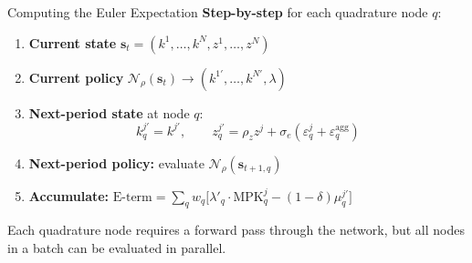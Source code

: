 \documentclass[aspectratio=169,11pt]{beamer}
\newcommand{\emphc}[1]{\textcolor{harvardcrimson}{#1}}
\begin{document}
\begin{frame}{Computing the Euler Expectation}
\textbf{Step-by-step} for each quadrature node $q$:

\vspace{0.3em}
\begin{enumerate}
    \item \textbf{Current state} $\bm{s}_t = (k^1, \ldots, k^N, z^1, \ldots, z^N)$
    \item \textbf{Current policy} $\mathcal{N}_\rho(\bm{s}_t) \to (k^{1\prime}, \ldots, k^{N\prime}, \lambda)$ 
    \item \textbf{Next-period state} at node $q$:
    \[
    k^{j\prime}_q = k^{j\prime}, \qquad z^{j\prime}_q = \rho_z z^j + \sigma_e(\varepsilon^j_q + \varepsilon^{\text{agg}}_q)
    \]
    \item \textbf{Next-period policy:} evaluate $\mathcal{N}_\rho(\bm{s}_{t+1,q})$
    \item \textbf{Accumulate:} $\text{E-term} = \sum_q w_q \bigl[\lambda'_q \cdot \text{MPK}^j_q - (1-\delta)\mu^{j\prime}_q\bigr]$
\end{enumerate}

\vspace{0.3em}
{\small Each quadrature node requires a \emphc{forward pass} through the network, but all nodes in a batch can be evaluated in parallel.}
\end{frame}
\end{document}

